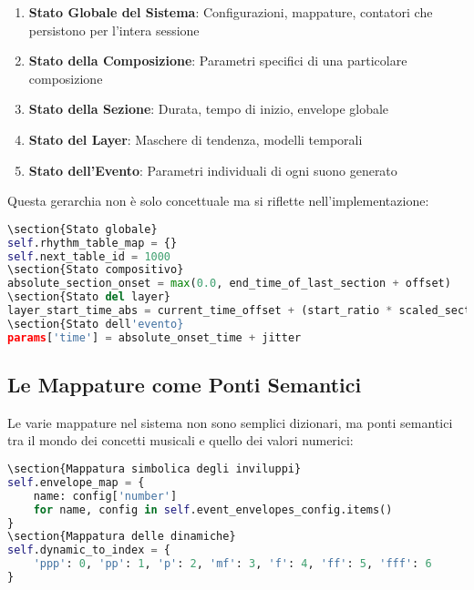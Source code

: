 \begin{enumerate}
    \item \textbf{Stato Globale del Sistema}: Configurazioni, mappature, contatori che persistono per l'intera sessione
    \item \textbf{Stato della Composizione}: Parametri specifici di una particolare composizione
    \item \textbf{Stato della Sezione}: Durata, tempo di inizio, envelope globale
    \item \textbf{Stato del Layer}: Maschere di tendenza, modelli temporali
    \item \textbf{Stato dell'Evento}: Parametri individuali di ogni suono generato
\end{enumerate}

Questa gerarchia non è solo concettuale ma si riflette nell'implementazione:

\begin{lstlisting}[language=Python]
\section{Stato globale}
self.rhythm_table_map = {}
self.next_table_id = 1000
\section{Stato compositivo}
absolute_section_onset = max(0.0, end_time_of_last_section + offset)
\section{Stato del layer}
layer_start_time_abs = current_time_offset + (start_ratio * scaled_section_duration)
\section{Stato dell'evento}
params['time'] = absolute_onset_time + jitter
\end{lstlisting}
\subsection{Le Mappature come Ponti Semantici}
Le varie mappature nel sistema non sono semplici dizionari, ma ponti semantici tra il mondo dei concetti musicali e quello dei valori numerici:

\begin{lstlisting}[language=Python]
\section{Mappatura simbolica degli inviluppi}
self.envelope_map = {
    name: config['number'] 
    for name, config in self.event_envelopes_config.items()
}
\section{Mappatura delle dinamiche}
self.dynamic_to_index = {
    'ppp': 0, 'pp': 1, 'p': 2, 'mf': 3, 'f': 4, 'ff': 5, 'fff': 6
}
\end{lstlisting}

